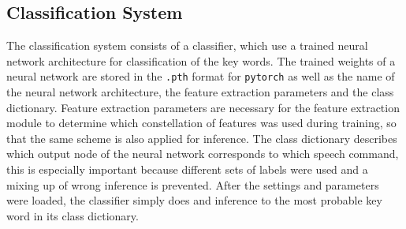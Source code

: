 

\subsection{Classification System}
The classification system consists of a classifier, which use a trained neural network architecture for classification of the key words.
The trained weights of a neural network are stored in the \texttt{.pth} format for \texttt{pytorch} as well as the name of the neural network architecture, the feature extraction parameters and the class dictionary.
Feature extraction parameters are necessary for the feature extraction module to determine which constellation of features was used during training, so that the same scheme is also applied for inference.
The class dictionary describes which output node of the neural network corresponds to which speech command, this is especially important because different sets of labels were used and a mixing up of wrong inference is prevented.
After the settings and parameters were loaded, the classifier simply does and inference to the most probable key word in its class dictionary.

